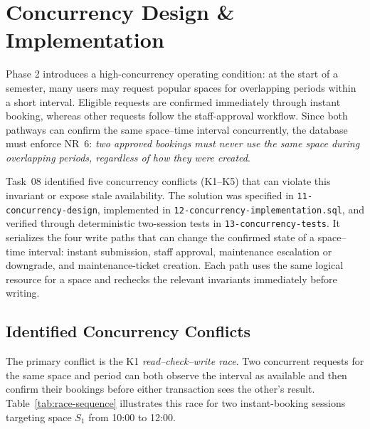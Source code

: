 \section{Concurrency Design \& Implementation}
\label{sec:concurrency}

Phase 2 introduces a high-concurrency operating condition: at the start of a
semester, many users may request popular spaces for overlapping periods within
a short interval. Eligible requests are confirmed immediately through instant
booking, whereas other requests follow the staff-approval workflow. Since both
pathways can confirm the same space--time interval concurrently, the database
must enforce NR~6: \emph{two approved bookings must never use the same space
during overlapping periods, regardless of how they were created}.

Task~08 identified five concurrency conflicts (K1--K5) that can violate this
invariant or expose stale availability. The solution was specified in
\texttt{11-concurrency-design}, implemented in
\texttt{12-concurrency-implementation.sql}, and verified through deterministic
two-session tests in \texttt{13-concurrency-tests}. It serializes the four
write paths that can change the confirmed state of a space--time interval:
instant submission, staff approval, maintenance escalation or downgrade, and
maintenance-ticket creation. Each path uses the same logical resource for a
space and rechecks the relevant invariants immediately before writing.

\subsection{Identified Concurrency Conflicts}

The primary conflict is the K1 \emph{read--check--write race}. Two concurrent
requests for the same space and period can both observe the interval as
available and then confirm their bookings before either transaction sees the
other's result. Table~\ref{tab:race-sequence} illustrates this race for two
instant-booking sessions targeting space $S_1$ from 10:00 to 12:00.

